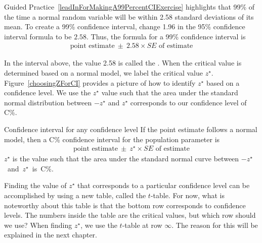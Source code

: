 \D{\newpage}

Guided Practice~\ref{leadInForMakingA99PercentCIExercise} highlights that 99\% of the time a normal random variable will be within 2.58 standard deviations of its mean. To create a 99\% confidence interval, change 1.96 in the 95\% confidence interval formula to be $2.58$. Thus, the formula for a 99\% confidence interval is
\begin{align*}
\text{point estimate}\ \pm\ 2.58\times SE \text{ of estimate}
\end{align*}


In the interval above, the value 2.58 is called the .  When the critical value is determined based on a normal model, we label the critical value $z^{\star}$.  Figure~\ref{choosingZForCI} provides a picture of how to identify $z^{\star}$ based on a confidence level.  We use the $z^{\star}$ value such that the area under the standard normal distribution between $-z^{\star}$ and $z^{\star}$  corresponds to our confidence level of C\%.

\begin{onebox}{Confidence interval for any confidence level}
If the point estimate follows a normal model, then a C\% confidence interval for the population parameter is
\begin{eqnarray*}
\text{point estimate}\ \pm\ z^{\star} \times SE \text{ of estimate}
\end{eqnarray*}
$z^{\star}$ is the value such that the area under the standard normal curve between \mbox{$-z^{\star}$ and $z^{\star}$ is C\%.}
\end{onebox}

Finding the value of $z^{\star}$ that corresponds to a particular confidence level can be accomplished by using a new table, called the $t$-table. For now, what is noteworthy about this table is that the bottom row corresponds to confidence levels. The numbers inside the table are the critical values, but which row should we use? When finding $z^{\star}$, we use the $t$-table at row $\infty$.  The reason for this will be explained in the next chapter.

